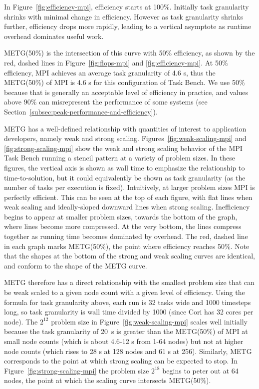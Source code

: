 In Figure~\ref{fig:efficiency-mpi},
efficiency starts at 100\%. Initially task granularity
shrinks with minimal change in efficiency. However as task
granularity shrinks further, efficiency drops more rapidly, leading
to a vertical asymptote as runtime overhead dominates useful work.


METG(50\%) is the intersection of this curve with 50\% efficiency, as
shown by the red, dashed lines in Figure~\ref{fig:flops-mpi} and
\ref{fig:efficiency-mpi}. At 50\% efficiency, MPI achieves an average
task granularity of
4.6 \textmu{}s, thus the METG(50\%) of MPI is 4.6 \textmu{}s for this configuration of
Task Bench. We use 50\% because that is generally an acceptable level
of efficiency in practice, and values above 90\% can misrepresent the
performance of some systems (see
Section~\ref{subsec:peak-performance-and-efficiency}).




METG has a well-defined
relationship with quantities of interest to application developers,
namely weak and strong scaling. Figures~\ref{fig:weak-scaling-mpi} and
\ref{fig:strong-scaling-mpi} show the weak and strong scaling behavior of the MPI Task Bench running a stencil pattern at a variety of problem sizes. In these
figures, the vertical axis is shown as wall time to emphasize the
relationship to time-to-solution, but it could equivalently be shown
as task granularity (as the number of tasks per execution is
fixed). Intuitively, at
larger problem sizes MPI is perfectly efficient. This can be seen at
the top of each figure, with flat lines when weak scaling and
ideally-sloped downward lines when strong scaling. Inefficiency begins
to appear at smaller problem sizes, towards the bottom of the graph,
where lines become more compressed. At the
very bottom, the lines compress together as running time becomes
dominated by overhead. The red, dashed line in each graph marks
METG(50\%), the point where efficiency reaches 50\%. Note that the
shapes at the bottom of the strong and weak scaling curves are identical,
and conform to the shape of the METG curve.

METG therefore has a direct relationship with the smallest problem
size that can be weak scaled to a given node count with a given level
of efficiency. Using the formula for task granularity above, each run
is 32 tasks wide and 1000 timesteps long, so task granularity is wall
time divided by 1000 (since Cori has 32 cores per node). The $2^{12}$
problem size in Figure~\ref{fig:weak-scaling-mpi} scales well
initially because the task granularity of 20~\textmu{}s is greater
than the METG(50\%) of MPI at small node counts (which is about 4.6-12
\textmu{}s from 1-64 nodes) but not at higher node counts (which rises
to 28 \textmu{}s at 128 nodes and 61 \textmu{}s at 256). Similarly,
METG corresponds to the point at which strong scaling can be expected
to stop. In Figure~\ref{fig:strong-scaling-mpi} the problem size
$2^{18}$ begins to peter out at 64 nodes, the point at which the
scaling curve intersects METG(50\%).

